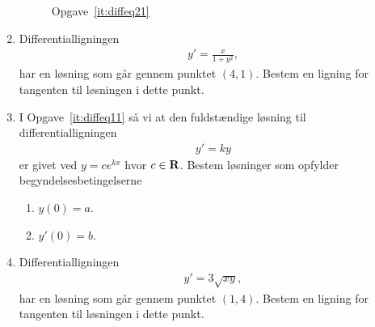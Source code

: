 \begin{enumerate}
	
	\begin{figure}
		\centering
		\caption{Opgave~\ref{it:diffeq21}}
		\label{fig:diffeq21}
	\end{figure}
	
		\item Differentialligningen
	\begin{align*}
	y'=\frac{x}{1+y^2},
	\end{align*}
	har en løsning som går gennem punktet $(4,1)$. Bestem en ligning for tangenten til løsningen i dette punkt.
	
	
	\item I Opgave~\ref{it:diffeq11} så vi at den fuldstændige løsning til differentialligningen
	\begin{align*}
	y'=ky
	\end{align*}
	er givet ved $y=ce^{kx}$ hvor $c\in \mathbf{R}$. Bestem løsninger som opfylder begyndelsesbetingelserne
	\begin{enumerate}
		\item $y(0)=a$.
		\item $y'(0)=b$.
	\end{enumerate}
	
	
	\item Differentialligningen
	\begin{align*}
	y'=3\sqrt{xy},
	\end{align*}
	har en løsning som går gennem punktet $(1,4)$. Bestem en ligning for tangenten til løsningen i dette punkt.
	

	
	

\end{enumerate}
